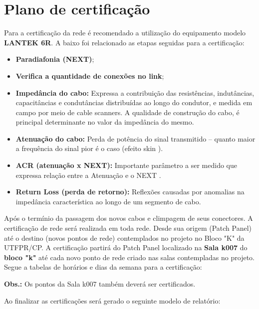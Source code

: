 \documentclass[	DIV=calc,%
							paper=a4,%
							fontsize=12pt,%
							onecolumn]{scrartcl}	 					%
\begin{document}
\section{Plano de certificação}
Para a certificação da rede é recomendado a utilização do equipamento modelo \textbf{LANTEK 6R}. 
A baixo foi relacionado as etapas seguidas para a certificação:
\begin{itemize}
\item \textbf{Paradiafonia (NEXT)};
\item \textbf{Verifica a quantidade de conexões no link};
\item \textbf{Impedância do cabo:} Expressa a contribuição das resistências, indutâncias, capacitâncias e condutâncias distribuídas ao longo do condutor, e medida em campo por meio de cable scanners. A qualidade de construção do cabo, é principal determinante no valor da impedância do mesmo.
\item \textbf{Atenuação do cabo:} Perda de potência do sinal transmitido – quanto maior a frequência do sinal pior é o caso (efeito skin ).
\item \textbf{ACR (atenuação x NEXT):} Importante parâmetro a ser medido que expressa relação entre a Atenuação e o NEXT .
\item \textbf{Return Loss (perda de retorno):} Reflexões causadas por anomalias na impedância característica ao longo de um segmento de cabo.
\end{itemize}
Após o termínio da passagem dos novos cabos e climpagem de seus conectores. A certificação de rede será realizada em toda rede. Desde sua origem (Patch Panel) até o destino (novos pontos de rede) contemplados no projeto no Bloco "K" da UTFPR/CP. 
A certificação partirá do Patch Panel localizado na \textbf{Sala k007} do \textbf{bloco "k"} até cada novo ponto de rede criado nas salas contempladas no projeto. 
Segue a tabelas de horários e dias da semana para a certificação:


\textbf{Obs.:} Os pontos da Sala k007 também deverá ser certificados.


Ao finalizar as certificações será gerado o seguinte modelo de relatório:
\end{document}

